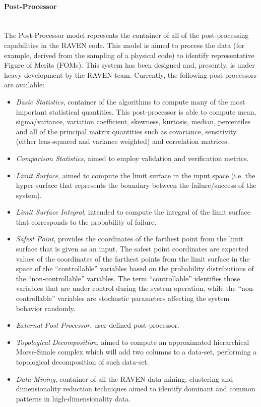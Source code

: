 \paragraph{Post-Processor} ~\\
The Post-Processor model represents the container of all of the post-processing capabilities in the RAVEN code. This model is aimed to process the data (for example, derived from the sampling of a physical code)  to identify representative Figure of Merits (FOMs). This system has  been designed and, presently, is under heavy development by the RAVEN team.  Currently, the following post-processors are available:
\begin{itemize}
 \item \textit{Basic Statistics}, container of the algorithms to compute many of the most important statistical quantities. This post-processor is able to compute mean, sigma/variance, variation coefficient, skewness, kurtosis, median, percentiles and all of the principal matrix quantities such as covariance, sensitivity (either leas-squared and variance weighted) and correlation matrices.
 \item \textit{Comparison Statistics}, aimed to employ validation and verification metrics.
 \item \textit{Limit Surface}, aimed to compute the limit surface in the input space (i.e. the hyper-surface that represents the boundary between the failure/success of the system).
 \item \textit{Limit Surface Integral}, intended to compute the integral of the limit surface that corresponds to the probability of failure.
  \item \textit{Safest Point}, provides the coordinates of the farthest point from the limit surface that is given as an input. The safest point coordinates are expected values of the coordinates of the farthest points from the limit surface in the space of the ``controllable'' variables based on the probability distributions of the ``non-controllable'' variables. The term ``controllable'' identifies those variables that are under control during the system operation, while the ``non-controllable'' variables are stochastic parameters affecting the system behavior randomly.
 \item \textit{External Post-Processor}, user-defined post-processor.
 \item \textit{Topological Decomposition}, aimed to compute an approximated hierarchical Morse-Smale complex which will add two columns to a data-set, performing a topological decomposition of such data-set.
 \item \textit{Data Mining}, container of all the RAVEN data mining, clustering and dimensionality reduction techniques aimed to identify dominant and common patterns in high-dimensionality data.
\end{itemize}

